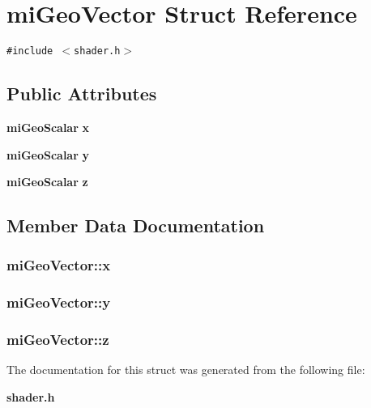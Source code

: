 \section{mi\-Geo\-Vector Struct Reference}
\label{structmiGeoVector}
{\tt \#include $<$shader.h$>$}

\subsection*{Public Attributes}
\begin{CompactItemize}
\item 
{\bf mi\-Geo\-Scalar} {\bf x}
\item 
{\bf mi\-Geo\-Scalar} {\bf y}
\item 
{\bf mi\-Geo\-Scalar} {\bf z}
\end{CompactItemize}


\subsection{Member Data Documentation}
\subsubsection{ {\bf mi\-Geo\-Vector::x}}\label{structmiGeoVector_o0}


\subsubsection{ {\bf mi\-Geo\-Vector::y}}\label{structmiGeoVector_o1}


\subsubsection{ {\bf mi\-Geo\-Vector::z}}\label{structmiGeoVector_o2}




The documentation for this struct was generated from the following file:\begin{CompactItemize}
\item 
{\bf shader.h}\end{CompactItemize}
